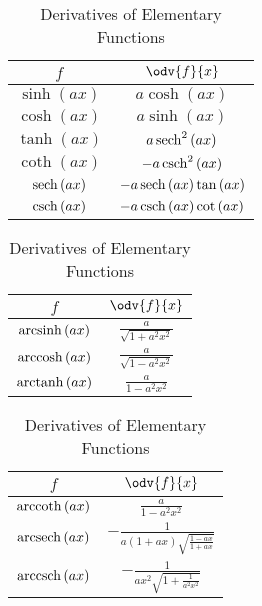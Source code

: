 \documentclass{article}
\begin{document}
\begin{table}[H]
    \renewcommand*{\arraystretch}{1.5}
    \centering
    \hspace*{-1cm}
    \begin{tabular}{c c}
        \toprule
        \(f\)                        & \(\odv{f}{x}\)                                         \\
        \midrule
        \(\sinh{\left( ax \right)}\) & \(a\cosh{\left( ax \right)}\)                         \\
        \(\cosh{\left( ax \right)}\) & \(a\sinh{\left( ax \right)}\)                         \\
        \(\tanh{\left( ax \right)}\) & \(a\sech^2{\left( ax \right)}\)                       \\
        \(\coth{\left( ax \right)}\) & \(-a\csch^2{\left( ax \right)}\)                      \\
        \(\sech{\left( ax \right)}\) & \(-a\sech{\left( ax \right)}\tan{\left( ax \right)}\) \\
        \(\csch{\left( ax \right)}\) & \(-a\csch{\left( ax \right)}\cot{\left( ax \right)}\) \\[5pt]
        \bottomrule
    \end{tabular}
    \begin{tabular}{c c}
        \toprule
        \(f\)                           & \(\odv{f}{x}\)                               \\
        \midrule
        \(\operatorname{arcsinh}{\left( ax \right)}\) & \(\displaystyle \frac{a}{\sqrt{1+a^2x^2}}\) \\[8pt]
        \(\operatorname{arccosh}{\left( ax \right)}\) & \(\displaystyle \frac{a}{\sqrt{1-a^2x^2}}\) \\[8pt]
        \(\operatorname{arctanh}{\left( ax \right)}\) & \(\displaystyle \frac{a}{1-a^2x^2}\)        \\[8pt]
        \bottomrule
    \end{tabular}
    \begin{tabular}{c c}
        \toprule
        \(f\)                           & \(\odv{f}{x}\)                                                             \\
        \midrule
        \(\operatorname{arccoth}{\left( ax \right)}\) & \(\displaystyle  \frac{a}{1-a^2x^2}\)                                     \\[8pt]
        \(\operatorname{arcsech}{\left( ax \right)}\) & \(\displaystyle -\frac{1}{a\left( 1+ax \right)\sqrt{\frac{1-ax}{1+ax}}}\) \\[8pt]
        \(\operatorname{arccsch}{\left( ax \right)}\) & \(\displaystyle -\frac{1}{ax^2\sqrt{1+\frac{1}{a^2x^2}}}\)                \\[8pt]
        \bottomrule
    \end{tabular}
    \hspace*{-1cm}
    \caption{Derivatives of Elementary Functions}
\end{table}
\end{document}
